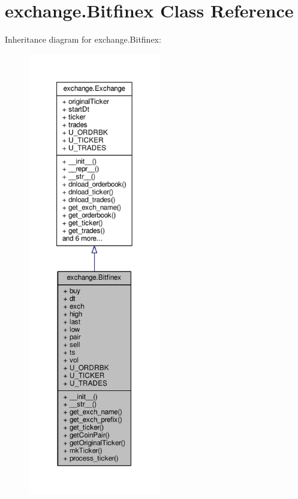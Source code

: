 \hypertarget{classexchange_1_1_bitfinex}{}\section{exchange.\+Bitfinex Class Reference}
\label{classexchange_1_1_bitfinex}


Inheritance diagram for exchange.\+Bitfinex\+:
\nopagebreak
\begin{figure}[H]
\begin{center}
\leavevmode
\includegraphics[height=550pt]{classexchange_1_1_bitfinex__inherit__graph}
\end{center}
\end{figure}


